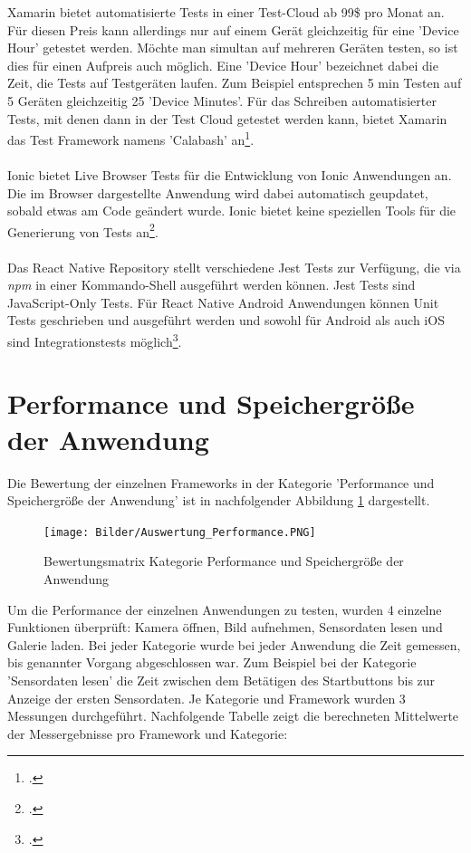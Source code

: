 Xamarin bietet automatisierte Tests in einer Test-Cloud ab 99\$ pro Monat an. Für diesen Preis kann allerdings nur auf einem Gerät gleichzeitig für eine 'Device Hour' getestet werden. Möchte man simultan auf mehreren Geräten testen, so ist dies für einen Aufpreis auch möglich. Eine 'Device Hour' bezeichnet dabei die Zeit, die Tests auf Testgeräten laufen. Zum Beispiel entsprechen 5 min Testen auf 5 Geräten gleichzeitig 25 'Device Minutes'. Für das Schreiben automatisierter Tests, mit denen dann in der Test Cloud getestet werden kann, bietet Xamarin das Test Framework namens 'Calabash' an\footcite{XamarinHomepage}. 
\\
\\
Ionic bietet Live Browser Tests für die Entwicklung von Ionic Anwendungen an. Die im Browser dargestellte Anwendung wird dabei automatisch geupdatet, sobald etwas am Code geändert wurde. Ionic bietet keine speziellen Tools für die Generierung von Tests an\footcite{IonicHomepage}. 
\\
\\
Das React Native Repository stellt verschiedene Jest Tests zur Verfügung, die via \textit{npm} in einer Kommando-Shell ausgeführt werden können. Jest Tests sind JavaScript-Only Tests. Für React Native Android Anwendungen können Unit Tests geschrieben und ausgeführt werden und sowohl für Android als auch iOS sind Integrationstests möglich\footcite{ReactNativeHomepage}. 

\section{Performance und Speichergröße der Anwendung} \label{AuswPerf}

Die Bewertung der einzelnen Frameworks in der Kategorie 'Performance und Speichergröße der Anwendung' ist in nachfolgender Abbildung \ref{fig:AuswPerf} dargestellt.

\begin{figure}[h]
	\centering
	\texttt{[image: Bilder/Auswertung\_Performance.PNG]}
	\caption{Bewertungsmatrix Kategorie Performance und Speichergröße der Anwendung}
	\label{fig:AuswPerf}
\end{figure}

Um die Performance der einzelnen Anwendungen zu testen, wurden 4 einzelne Funktionen überprüft: Kamera öffnen, Bild aufnehmen, Sensordaten lesen und Galerie laden. Bei jeder Kategorie wurde bei jeder Anwendung die Zeit gemessen, bis genannter Vorgang abgeschlossen war. Zum Beispiel bei der Kategorie 'Sensordaten lesen' die Zeit zwischen dem Betätigen des Startbuttons bis zur Anzeige der ersten Sensordaten. Je Kategorie und Framework wurden 3 Messungen durchgeführt. Nachfolgende Tabelle zeigt die berechneten Mittelwerte der Messergebnisse pro Framework und Kategorie:
\\

